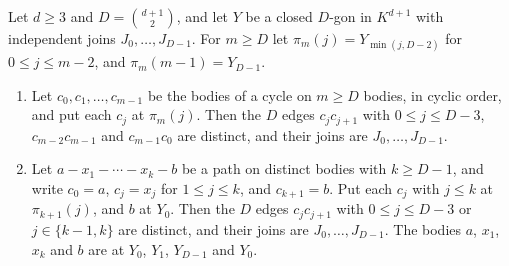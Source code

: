 \begin{lemma}
  \label{lem:pencil-d-polygon-collapse}
  \leanok
  Let $d \ge 3$ and $D = \binom{d+1}{2}$, and let $Y$ be a closed
  $D$-gon in $K^{d+1}$ with independent joins $J_0, \dots, J_{D-1}$. For
  $m \ge D$ let $\pi_m(j) = Y_{\min(j, D-2)}$ for $0 \le j \le m - 2$,
  and $\pi_m(m - 1) = Y_{D-1}$.
  \begin{enumerate}
    \item Let $c_0, c_1, \dots, c_{m-1}$ be the bodies of a cycle on
      $m \ge D$ bodies, in cyclic order, and put each $c_j$ at
      $\pi_m(j)$. Then the $D$ edges $c_j c_{j+1}$ with
      $0 \le j \le D - 3$, $c_{m-2} c_{m-1}$ and $c_{m-1} c_0$ are
      distinct, and their joins are $J_0, \dots, J_{D-1}$.
    \item Let $a - x_1 - \cdots - x_k - b$ be a path on distinct bodies
      with $k \ge D - 1$, and write $c_0 = a$, $c_j = x_j$ for
      $1 \le j \le k$, and $c_{k+1} = b$. Put each $c_j$ with $j \le k$
      at $\pi_{k+1}(j)$, and $b$ at $Y_0$. Then the $D$ edges
      $c_j c_{j+1}$ with $0 \le j \le D - 3$ or $j \in \{k - 1, k\}$ are
      distinct, and their joins are $J_0, \dots, J_{D-1}$. The bodies
      $a$, $x_1$, $x_k$ and $b$ are at $Y_0$, $Y_1$, $Y_{D-1}$ and $Y_0$.
  \end{enumerate}
\end{lemma}

